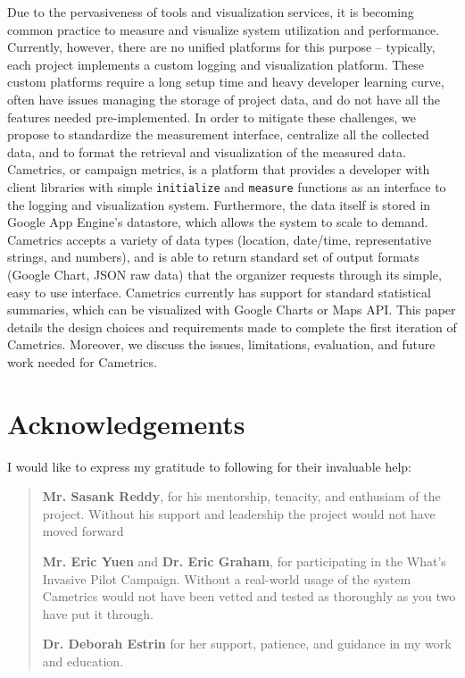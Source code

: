 \documentclass[10pt,a4paper,english]{article}
\begin{document}
Due to the pervasiveness of tools and visualization services, it is becoming common practice to measure and visualize system utilization and performance.  Currently, however, there are no unified platforms for this purpose {--} typically, each project implements a custom logging and visualization platform. These custom platforms require a long setup time and heavy developer learning curve, often have issues managing the storage of project data, and do not have all the features needed pre-implemented. In order to mitigate these challenges, we propose to standardize the measurement interface, centralize all the collected data, and to format the retrieval and visualization of the measured data. Cametrics, or campaign metrics, is a platform that provides a developer with client libraries with simple \texttt{initialize} and \texttt{measure} functions as an interface to the logging and visualization system. Furthermore, the data itself is stored in Google App Engine's datastore, which allows the system to scale to demand. Cametrics accepts a variety of data types (location, date/time, representative strings, and numbers), and is able to return standard set of output formats (Google Chart, JSON raw data) that the organizer requests through its simple, easy to use interface. Cametrics currently has support for standard statistical summaries, which can be visualized with Google Charts or Maps API. This paper details the design choices and requirements made to complete the first iteration of Cametrics. Moreover, we discuss the issues, limitations, evaluation, and future work needed for Cametrics.


\pagebreak{}




\hypertarget{acknowledgements}{}
\section*{Acknowledgements}
\label{acknowledgements}

I would like to express my gratitude to following for their invaluable help:
\begin{quote}

\textbf{Mr. Sasank Reddy}, for his mentorship, tenacity, and enthusiam of the project. Without his support and leadership the project would not have moved forward

\textbf{Mr. Eric Yuen} and \textbf{Dr. Eric Graham}, for participating in the What's Invasive Pilot Campaign. Without a real-world usage of the system Cametrics would not have been vetted and tested as thoroughly as you two have put it through.

\textbf{Dr. Deborah Estrin} for her support, patience, and guidance in my work and education.
\end{quote}
\end{document}

